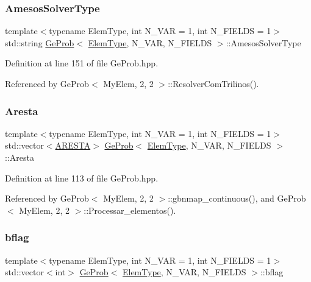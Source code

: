 \subsubsection{\texorpdfstring{Amesos\+Solver\+Type}{AmesosSolverType}}
{\footnotesize\ttfamily template$<$typename Elem\+Type, int N\+\_\+\+V\+AR = 1, int N\+\_\+\+F\+I\+E\+L\+DS = 1$>$ \\
std\+::string \hyperlink{classGeProb}{Ge\+Prob}$<$ \hyperlink{spectral_8h_aaa2c1a7b2d1b12c590d730fe6ac839fa}{Elem\+Type}, N\+\_\+\+V\+AR, N\+\_\+\+F\+I\+E\+L\+DS $>$\+::Amesos\+Solver\+Type\hspace{0.3cm}{\ttfamily [protected]}}



Definition at line 151 of file Ge\+Prob.\+hpp.



Referenced by Ge\+Prob$<$ My\+Elem, 2, 2 $>$\+::\+Resolver\+Com\+Trilinos().

\mbox{\label{classGeProb_af82bffefd5e8fe33dec7ef5b8098a9b4}} 
\subsubsection{\texorpdfstring{Aresta}{Aresta}}
{\footnotesize\ttfamily template$<$typename Elem\+Type, int N\+\_\+\+V\+AR = 1, int N\+\_\+\+F\+I\+E\+L\+DS = 1$>$ \\
std\+::vector$<$\hyperlink{structARESTA}{A\+R\+E\+S\+TA}$>$ \hyperlink{classGeProb}{Ge\+Prob}$<$ \hyperlink{spectral_8h_aaa2c1a7b2d1b12c590d730fe6ac839fa}{Elem\+Type}, N\+\_\+\+V\+AR, N\+\_\+\+F\+I\+E\+L\+DS $>$\+::Aresta\hspace{0.3cm}{\ttfamily [protected]}}



Definition at line 113 of file Ge\+Prob.\+hpp.



Referenced by Ge\+Prob$<$ My\+Elem, 2, 2 $>$\+::gbnmap\+\_\+continuous(), and Ge\+Prob$<$ My\+Elem, 2, 2 $>$\+::\+Processar\+\_\+elementos().

\mbox{\label{classGeProb_a60d3ba92d41a0776cdb3869e9bfeff7e}} 
\subsubsection{\texorpdfstring{bflag}{bflag}}
{\footnotesize\ttfamily template$<$typename Elem\+Type, int N\+\_\+\+V\+AR = 1, int N\+\_\+\+F\+I\+E\+L\+DS = 1$>$ \\
std\+::vector$<$int$>$ \hyperlink{classGeProb}{Ge\+Prob}$<$ \hyperlink{spectral_8h_aaa2c1a7b2d1b12c590d730fe6ac839fa}{Elem\+Type}, N\+\_\+\+V\+AR, N\+\_\+\+F\+I\+E\+L\+DS $>$\+::bflag\hspace{0.3cm}{\ttfamily [protected]}}



